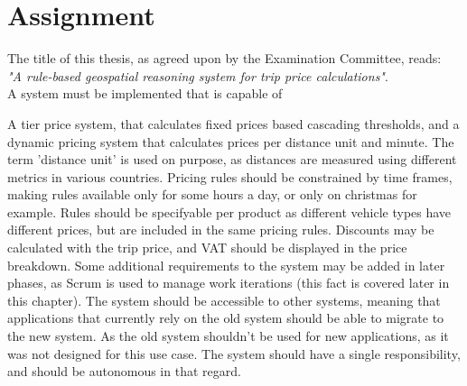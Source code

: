 %
\section{Assignment}
The title of this thesis, as agreed upon by the Examination Committee, reads: \\
\textit{"A rule-based geospatial reasoning system for trip price calculations"}. \\

A system must be implemented that is capable of

A tier price system, that calculates fixed prices based cascading thresholds, and a dynamic pricing system that calculates prices per distance unit and minute. The term 'distance unit' is used on purpose, as distances are measured using different metrics in various countries. Pricing rules should be constrained by time frames, making rules available only for some hours a day, or only on christmas for example. Rules should be specifyable per product as different vehicle types have different prices, but are included in the same pricing rules. Discounts may be calculated with the trip price, and VAT should be displayed in the price breakdown. Some additional requirements to the system may be added in later phases, as Scrum is used to manage work iterations (this fact is covered later in this chapter). The system should be accessible to other systems, meaning that applications that currently rely on the old system should be able to migrate to the new system. As the old system shouldn't be used for new applications, as it was not designed for this use case. The system should have a single responsibility, and should be autonomous in that regard.

%
